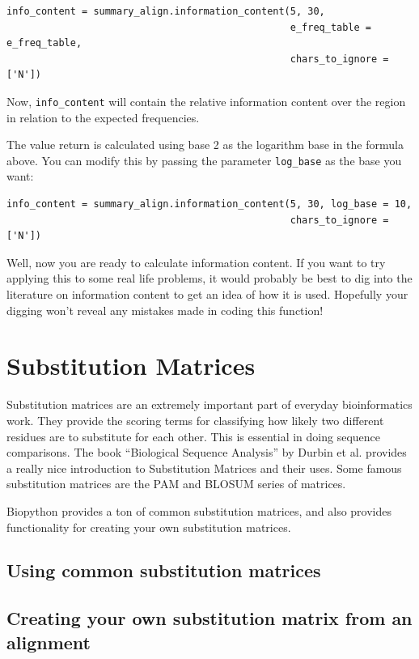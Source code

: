 \documentclass{report}
\begin{document}
\begin{verbatim}
info_content = summary_align.information_content(5, 30,
                                                 e_freq_table = e_freq_table,
                                                 chars_to_ignore = ['N'])
\end{verbatim}

Now, \verb|info_content| will contain the relative information content over the region in relation to the expected frequencies.

The value return is calculated using base 2 as the logarithm base in the formula above. You can modify this by passing the parameter \verb|log_base| as the base you want:

\begin{verbatim}
info_content = summary_align.information_content(5, 30, log_base = 10,
                                                 chars_to_ignore = ['N'])
\end{verbatim}

Well, now you are ready to calculate information content. If you want to try applying this to some real life problems, it would probably be best to dig into the literature on information content to get an idea of how it is used. Hopefully your digging won't reveal any mistakes made in coding this function!

\section{Substitution Matrices}
\label{sec:sub_matrix}

Substitution matrices are an extremely important part of everyday bioinformatics work. They provide the scoring terms for classifying how likely two different residues are to substitute for each other. This is essential in doing sequence comparisons. The book ``Biological Sequence Analysis'' by Durbin et al. provides a really nice introduction to Substitution Matrices and their uses. Some famous substitution matrices are the PAM and BLOSUM series of matrices.

Biopython provides a ton of common substitution matrices, and also provides functionality for creating your own substitution matrices.

\subsection{Using common substitution matrices}

\subsection{Creating your own substitution matrix from an alignment}
\label{sec:subs_mat_ex}
\end{document}
